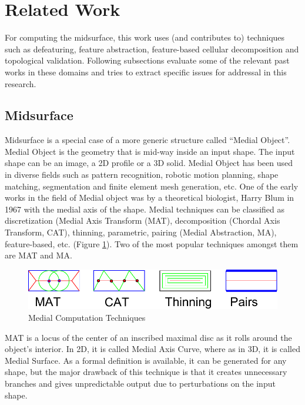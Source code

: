 
\section{Related Work}	

 For computing the midsurface, this work uses (and contributes to) techniques such as defeaturing, feature abstraction, feature-based  cellular decomposition and topological validation. Following subsections evaluate some of the relevant past works in these domains and tries to extract specific issues for addressal in this research.
 
 \subsection{Midsurface}
 
Midsurface is a special case of a more generic structure called ``Medial Object''. Medial Object is the geometry that is mid-way inside an input shape. The input shape can be an image, a 2D profile or a 3D solid. Medial Object has been used in diverse fields such as pattern recognition, robotic motion planning, shape matching, segmentation and finite element mesh generation, etc.  One of the early works in the field of Medial object was by a theoretical biologist, Harry Blum in 1967 \cite{Harry1967} with the medial axis of the shape. Medial techniques can be classified as discretization (Medial Axis Transform (MAT), decomposition (Chordal Axis Transform, CAT), thinning, parametric, pairing (Medial Abstraction, MA), feature-based, etc. (Figure \ref{fig:medials}). Two of the most popular techniques amongst them  are MAT and MA. 

	\begin{figure} [!h]
		\centering
		\includegraphics[width=0.6\linewidth]{..//Common/images/MedialMethodsOnlyShort.pdf}
		\caption{Medial Computation Techniques}
		\label{fig:medials}
	\end{figure}



MAT is a locus of the center of an inscribed maximal disc as it rolls around the object's interior.  In 2D, it is called Medial Axis Curve, where as in 3D, it is called Medial Surface. As a formal definition is available, it can be generated for any shape, but the major drawback of this technique is that it creates unnecessary branches and gives unpredictable output due to perturbations on the input shape.

